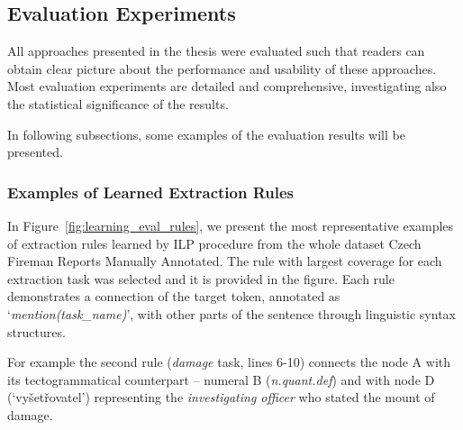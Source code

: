 \documentclass[12pt,a4paper,twoside,notitlepage]{article}
\begin{document}
\subsection{Evaluation Experiments}

All approaches presented in the thesis were evaluated such that readers can obtain clear picture about the performance and usability of these approaches. Most evaluation experiments are detailed and comprehensive, investigating also the statistical significance of the results.

In following subsections, some examples of the evaluation results will be presented. 


\subsubsection{Examples of Learned Extraction Rules}
In Figure~\ref{fig:learning_eval_rules}, we present the most representative examples of extraction rules learned by ILP procedure from the whole dataset Czech Fireman Reports Manually Annotated. The rule with largest coverage for each extraction task was selected and it is provided in the figure. Each rule demonstrates a connection of the target token, annotated as `\emph{mention(task\_name)}’, with other parts of the sentence through linguistic syntax structures. 

For example the second rule (\emph{damage} task, lines 6-10) connects the node A with its tectogrammatical counterpart -- numeral B (\emph{n.quant.def}) and with node D (`vyšetřovatel') representing the \emph{investigating officer} who stated the mount of damage. 
\end{document}
